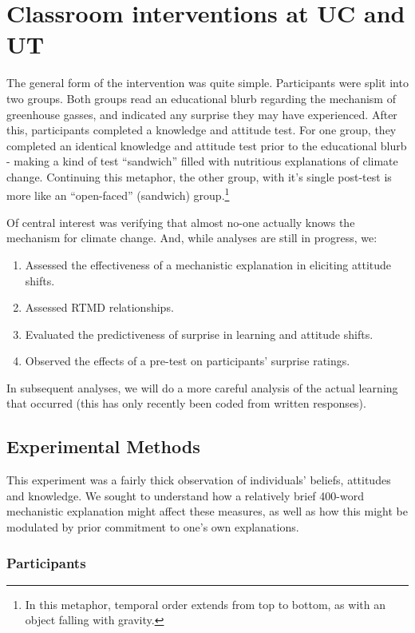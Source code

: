 \section{Classroom interventions at UC and UT}

The general form of the intervention was quite simple. Participants were split
into two groups. Both groups read an educational blurb regarding the mechanism
of greenhouse gasses, and indicated any surprise they may have experienced.
After this, participants completed a knowledge and attitude test. For one group,
they completed an identical knowledge and attitude test prior to the educational
blurb - making a kind of test ``sandwich'' filled with nutritious explanations
of climate change. Continuing this metaphor, the other group, with it's single
post-test is more like an ``open-faced'' (sandwich) group.\footnote{In this
    metaphor, temporal order extends from top to bottom, as with an object
    falling with gravity.}

Of central interest was verifying that almost no-one actually knows the
mechanism for climate change. And, while analyses are still in progress, we:

\begin{enumerate}
    \item Assessed the effectiveness of a mechanistic explanation in eliciting
        attitude shifts.
    \item Assessed RTMD relationships.
    \item Evaluated the predictiveness of surprise in learning and attitude shifts.
    \item Observed the effects of a pre-test on participants' surprise ratings.
\end{enumerate}

In subsequent analyses, we will do a more careful analysis of the actual
learning that occurred (this has only recently been coded from written responses).


\subsection{Experimental Methods}

This experiment was a fairly thick observation of individuals' beliefs,
attitudes and knowledge. We sought to understand how a relatively brief 400-word
mechanistic explanation might affect these measures, as well as how this might
be modulated by prior commitment to one's own explanations.

\subsubsection{Participants}

